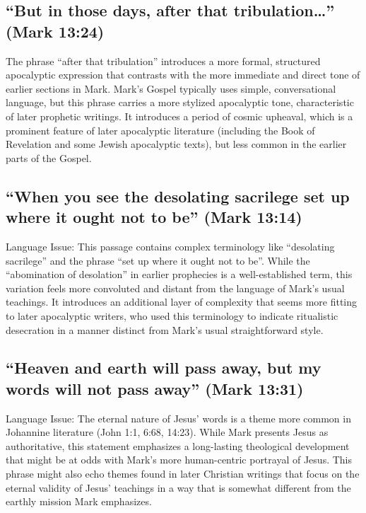 \subsection{\texorpdfstring{``But in those days, after that tribulation\ldots{}'' (Mark 13:24)}{4.
``But in those days, after that tribulation\ldots'' (Mark 13:24)}}\label{subsec:but-in-those-days-after-that-tribulation-mark-1324}

The phrase ``after that tribulation'' introduces a more formal, structured apocalyptic expression that contrasts with the more immediate and direct tone of earlier sections in Mark.
Mark's Gospel typically uses simple, conversational language, but this phrase carries a more stylized apocalyptic tone, characteristic of later prophetic writings.
It introduces a period of cosmic upheaval, which is a prominent feature of later apocalyptic literature (including the Book of Revelation and some Jewish apocalyptic texts), but less common in the earlier parts of the Gospel.

\subsection{``When you see the desolating sacrilege set up where it ought not to be'' (Mark 13:14)}\label{subsec:when-you-see-the-desolating-sacrilege-set-up-where-it-ought-not-to-be-mark-1314}

Language Issue: This passage contains complex terminology like ``desolating sacrilege'' and the phrase ``set up where it ought not to be''.
While the ``abomination of desolation'' in earlier prophecies is a well-established term, this variation feels more convoluted and distant from the language of Mark's usual teachings.
It introduces an additional layer of complexity that seems more fitting to later apocalyptic writers, who used this terminology to indicate ritualistic desecration in a manner distinct from Mark's usual straightforward style.

\subsection{``Heaven and earth will pass away, but my words will not pass away'' (Mark 13:31)}\label{subsec:heaven-and-earth-will-pass-away-but-my-words-will-not-pass-away-mark-1331}

Language Issue: The eternal nature of Jesus' words is a theme more common in Johannine literature (John 1:1, 6:68, 14:23).
While Mark presents Jesus as authoritative, this statement emphasizes a long-lasting theological development that might be at odds with Mark's more human-centric portrayal of Jesus.
This phrase might also echo themes found in later Christian writings that focus on the eternal validity of Jesus' teachings in a way that is somewhat different from the earthly mission Mark emphasizes.

